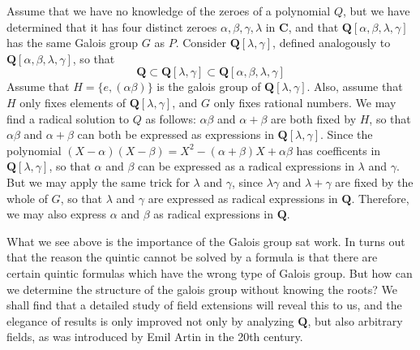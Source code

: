 Assume that we have no knowledge of the zeroes of a polynomial $Q$, but we have determined that it has four distinct zeroes $\alpha, \beta, \gamma, \lambda$ in $\mathbf{C}$, and that $\mathbf{Q}[\alpha, \beta, \lambda, \gamma]$ has the same Galois group $G$ as $P$. Consider $\mathbf{Q}[\lambda, \gamma]$, defined analogously to $\mathbf{Q}[\alpha, \beta, \lambda, \gamma]$, so that
%
\[ \mathbf{Q} \subset \mathbf{Q}[\lambda, \gamma] \subset \mathbf{Q}[\alpha, \beta, \lambda, \gamma] \]
%
Assume that $H = \{ e, (\alpha \beta) \}$ is the galois group of $\mathbf{Q}[\lambda, \gamma]$. Also, assume that $H$ only fixes elements of $\mathbf{Q}[\lambda, \gamma]$, and $G$ only fixes rational numbers. We may find a radical solution to $Q$ as follows: $\alpha \beta$ and $\alpha + \beta$ are both fixed by $H$, so that $\alpha \beta$ and $\alpha + \beta$ can both be expressed as expressions in $\mathbf{Q}[\lambda, \gamma]$. Since the polynomial $(X - \alpha)(X - \beta) = X^2 - (\alpha + \beta) X + \alpha \beta$ has coefficents in $\mathbf{Q}[\lambda, \gamma]$, so that $\alpha$ and $\beta$ can be expressed as a radical expressions in $\lambda$ and $\gamma$. But we may apply the same trick for $\lambda$ and $\gamma$, since $\lambda \gamma$ and $\lambda + \gamma$ are fixed by the whole of $G$, so that $\lambda$ and $\gamma$ are expressed as radical expressions in $\mathbf{Q}$. Therefore, we may also express $\alpha$ and $\beta$ as radical expressions in $\mathbf{Q}$.

What we see above is the importance of the Galois group sat work. In turns out that the reason the quintic cannot be solved by a formula is that there are certain quintic formulas which have the wrong type of Galois group. But how can we determine the structure of the galois group without knowing the roots? We shall find that a detailed study of field extensions will reveal this to us, and the elegance of results is only improved not only by analyzing $\mathbf{Q}$, but also arbitrary fields, as was introduced by Emil Artin in the 20th century.